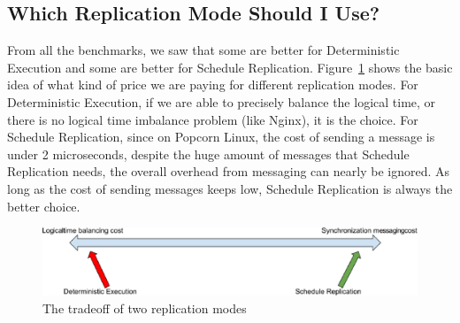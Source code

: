 \subsection{Which Replication Mode Should I Use?}
From all the benchmarks, we saw that some are better for Deterministic Execution and some are better for Schedule Replication. Figure~\ref{f:trade_off} shows the basic idea of what kind of price we are paying for different replication modes. For Deterministic Execution, if we are able to precisely balance the logical time, or there is no logical time imbalance problem (like Nginx), it is the choice. For Schedule Replication, since on Popcorn Linux, the cost of sending a message is under 2 microseconds, despite the huge amount of messages that Schedule Replication needs, the overall overhead from messaging can nearly be ignored. As long as the cost of sending messages keeps low, Schedule Replication is always the better choice.

\begin{figure}
\centering
\includegraphics[width=1\columnwidth]{figures/tradeoff}
\caption{The tradeoff of two replication modes}
\label{f:trade_off}
\end{figure}